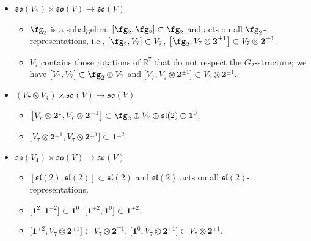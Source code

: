 \documentclass[pdftex]{sigma}
\numberwithin{equation}{section}
\theoremstyle{definition}
\def\R{\mathbb{R}}
\def\lie#1{\ensuremath{\mathfrak{#1}}}
\def\so{\lie{so}}
\begin{document}
\begin{itemize}\itemsep=0pt
 \item[]\underline{$\lie{so}(V_7) \times \so(V) \longrightarrow \lie{so}(V)$}
 \begin{itemize}\itemsep=0pt
 \item[--] $\fg_2$ is a subalgebra, $[\fg_2 , \fg_2] \subset \fg_2$ and acts on all $\fg_2$-representations, i.e., $[\fg_2, V_7] \subset V_7$, $\big[\fg_2, V_7 \otimes \textbf{2}^{\pm 1}\big] \subset V_7 \otimes \textbf{2}^{\pm 1}$.
 \item[--] $V_7$ contains those rotations of $\R^7$ that do not respect the $G_2$-structure; we have $[V_7,V_7] \subset \fg_2 \oplus V_7$ and $\big[V_7, V_7 \otimes \textbf{2}^{\pm 1}\big] \subset V_7 \otimes \textbf{2}^{\pm 1}$.
 \end{itemize}
 \item[]\underline{$(V_7 \otimes V_4) \times \so(V) \longrightarrow \lie{so}(V)$}
 \begin{itemize}\itemsep=0pt
 \item[--] $\big[V_7 \otimes \textbf{2}^{1}, V_7 \otimes \textbf{2}^{-1}\big] \subset \fg_2 \oplus V_7 \oplus \lie{sl}(2) \oplus \textbf{1}^0$.
 \item[--] $\big[V_7 \otimes \textbf{2}^{\pm 1}, V_7 \otimes \textbf{2}^{\pm 1}\big] \subset \textbf{1}^{\pm 2}$.
 \end{itemize}
 \item[] \underline{$\lie{so}(V_4) \times \so(V) \longrightarrow \lie{so}(V)$}
 \begin{itemize}\itemsep=0pt
 \item[--] $[\lie{sl}(2), \lie{sl}(2)] \subset \lie{sl}(2)$ and $\lie{sl}(2)$ acts on all $\lie{sl}(2)$-representations.
 \item[--] $\big[\textbf{1}^2,\textbf{1}^{-2}\big] \subset \textbf{1}^0$, $\big[\textbf{1}^{\pm 2},\textbf{1}^{0}\big] \subset \textbf{1}^{\pm 2}$.
 \item[--] $\big[\textbf{1}^{\pm 2} , V_7 \otimes \textbf{2}^{\pm 1}\big] \subset V_7 \otimes \textbf{2}^{\mp 1}$, $\big[\textbf{1}^{0} , V_7 \otimes \textbf{2}^{\pm 1}\big] \subset V_7 \otimes \textbf{2}^{\pm 1}$.
 \end{itemize}
\end{itemize}
\end{document}
